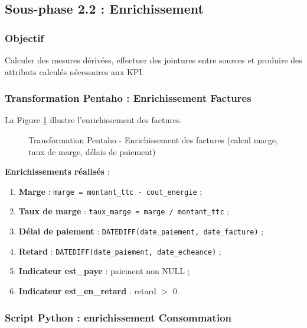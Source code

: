 \documentclass[12pt,a4paper]{report}
\begin{document}
\subsection{Sous-phase 2.2 : Enrichissement}

\subsubsection{Objectif}

Calculer des mesures dérivées, effectuer des jointures entre sources et produire des attributs calculés nécessaires aux KPI.

\subsubsection{Transformation Pentaho : Enrichissement Factures}

La Figure \ref{fig:enrichissement_factures} illustre l'enrichissement des factures.

\begin{figure}[H]
    \centering
    \caption{Transformation Pentaho - Enrichissement des factures (calcul marge, taux de marge, délais de paiement)}
    \label{fig:enrichissement_factures}
\end{figure}

\textbf{Enrichissements réalisés} :
\begin{enumerate}
    \item \textbf{Marge} : \texttt{marge = montant\_ttc - cout\_energie} ;
    \item \textbf{Taux de marge} : \texttt{taux\_marge = marge / montant\_ttc} ;
    \item \textbf{Délai de paiement} : \texttt{DATEDIFF(date\_paiement, date\_facture)} ;
    \item \textbf{Retard} : \texttt{DATEDIFF(date\_paiement, date\_echeance)} ;
    \item \textbf{Indicateur est\_paye} : paiement non NULL ;
    \item \textbf{Indicateur est\_en\_retard} : retard $>$ 0.
\end{enumerate}

\subsubsection{Script Python : enrichissement Consommation}
\end{document}
